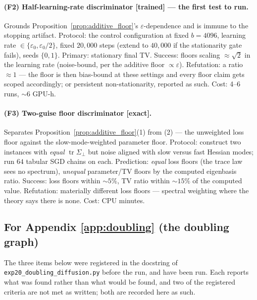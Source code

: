 \paragraph{(F2) Half-learning-rate discriminator [trained] --- the first test to run.}
Grounds Proposition~\ref{prop:additive_floor}'s $\varepsilon$-dependence and is immune
to the stopping artifact. Protocol: the control configuration at fixed $b=4096$,
learning rate $\in\{\varepsilon_0,\varepsilon_0/2\}$, fixed $20{,}000$ steps (extend to
$40{,}000$ if the stationarity gate fails), seeds $\{0,1\}$. Primary: stationary final
TV. Success: floors scaling $\approx\sqrt2$ in the learning rate (noise-bound, per the
additive floor $\propto\varepsilon$). Refutation: a ratio $\approx1$ --- the floor is
then bias-bound at these settings and every floor claim gets scoped accordingly; or
persistent non-stationarity, reported as such. Cost: 4--6 runs, $\sim$6 GPU-h.

\paragraph{(F3) Two-guise floor discriminator [exact].}
Separates Proposition~\ref{prop:additive_floor}(1) from (2) --- the unweighted loss
floor against the slow-mode-weighted parameter floor. Protocol: construct two instances
with \emph{equal} $\operatorname{tr}\Sigma_\perp$ but noise aligned with slow versus
fast Hessian modes; run $64$ tabular SGD chains on each. Prediction: \emph{equal} loss
floors (the trace law sees no spectrum), \emph{unequal} parameter/TV floors by the
computed eigenbasis ratio. Success: loss floors within $\sim5\%$, TV ratio within
$\sim15\%$ of the computed value. Refutation: materially different loss floors ---
spectral weighting where the theory says there is none. Cost: CPU minutes.

\subsection{For Appendix \ref{app:doubling} (the doubling graph)}\label{sec:program_doubling}

The three items below were registered in the docstring of
\texttt{exp20\_doubling\_diffusion.py} before the run, and have been run. Each reports what was
found rather than what would be found, and two of the registered criteria are not met as
written; both are recorded here as such.

